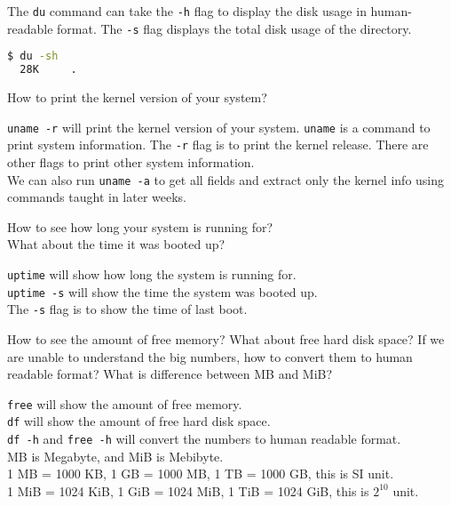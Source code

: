The \lstinline|du| command can take the \lstinline|-h| flag to display the disk usage in human-readable format.
The \lstinline|-s| flag displays the total disk usage of the directory.

\begin{lstlisting}[language=bash]
  $ du -sh
  28K     .
\end{lstlisting}


\begin{qs}
  How to print the kernel version of your system?
\end{qs}

\begin{ans}
  \lstinline|uname -r| will print the kernel version of your system.
  \lstinline|uname| is a command to print system information.
  The \lstinline|-r| flag is to print the kernel release.
  There are other flags to print other system information. \\
  We can also run \lstinline|uname -a| to get all fields and extract only the
  kernel info using commands taught in later weeks.
\end{ans}

\begin{qs}
  How to see how long your system is running for? \\
  What about the time it was booted up?
\end{qs}

\begin{ans}
  \lstinline|uptime| will show how long the system is running for.\\
  \lstinline|uptime -s| will show the time the system was booted up. \\
  The \lstinline|-s| flag is to show the time of last boot.
\end{ans}

\begin{qs}
  How to see the amount of free memory? What about free hard disk space?
  If we are unable to understand the big numbers, how to convert them to human readable format?
  What is difference between MB and MiB?
\end{qs}

\begin{ans}
  \lstinline|free| will show the amount of free memory. \\
  \lstinline|df| will show the amount of free hard disk space. \\
  \lstinline|df -h| and \lstinline|free -h|
  will convert the numbers to human readable format. \\
  MB is Megabyte, and MiB is Mebibyte. \\
  1 MB = 1000 KB, 1 GB = 1000 MB, 1 TB = 1000 GB, this is SI unit. \\
  1 MiB = 1024 KiB, 1 GiB = 1024 MiB, 1 TiB = 1024 GiB, this is $2^{10}$ unit.
\end{ans}

